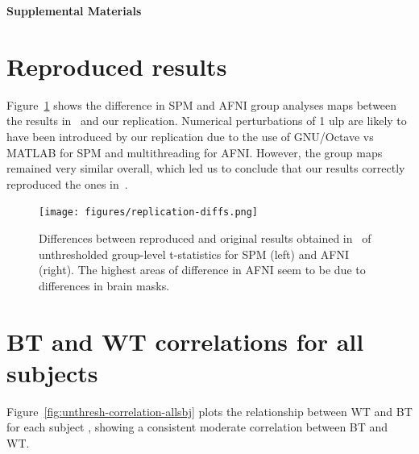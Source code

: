 \documentclass[11pt,onecolumn]{article}
\begin{document}
\setcounter{equation}{0}
\setcounter{figure}{0}
\setcounter{table}{0}
\setcounter{section}{0}

\makeatletter
\renewcommand{\theequation}{S\arabic{equation}}
\renewcommand{\thefigure}{S\arabic{figure}}
\renewcommand{\thesection}{S\arabic{section}}

\textbf{\centering \Large Supplemental Materials}

\section{Reproduced results}
\label{sec:supp-repro}

Figure~\ref{fig:replication-diff} shows the difference in SPM and AFNI
group analyses maps between the results in~\cite{bowring2019exploring} and
our replication. Numerical perturbations of 1 ulp are likely to have been
introduced by our replication due to the use of GNU/Octave vs MATLAB for SPM
and multithreading for AFNI.
  However, the group maps remained very similar
overall, which led us to conclude that our results correctly reproduced
the ones in~\cite{bowring2019exploring}.
\begin{figure}[ht]
  \texttt{[image: figures/replication-diffs.png]}
  \caption{Differences between reproduced and original results obtained in~\cite{bowring2019exploring}
    of unthresholded group-level t-statistics for SPM (left) and AFNI
    (right). The highest areas of difference in AFNI seem to be due to
    differences in brain masks.}
  \label{fig:replication-diff}
\end{figure}

\section{BT and WT correlations for all subjects}
\label{sec:supp-subjects}

Figure~\ref{fig:unthresh-correlation-allsbj} plots the relationship between
WT and BT for each subject , showing a consistent moderate correlation between BT and
WT.
\end{document}
